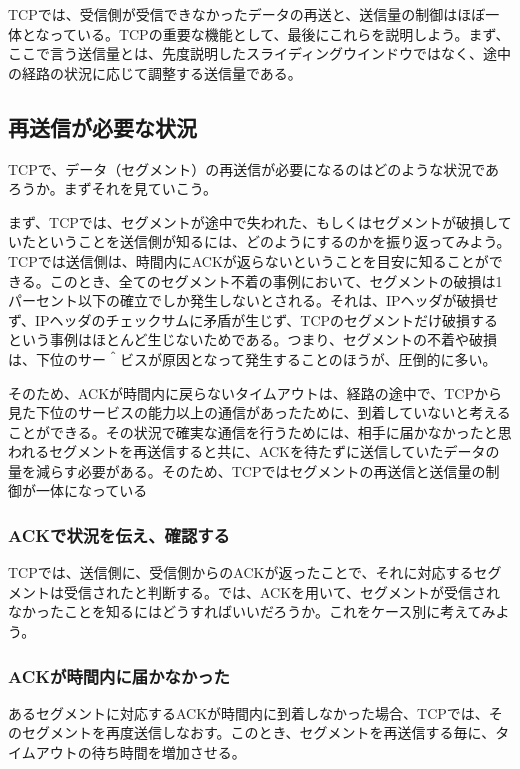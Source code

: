 TCPでは、受信側が受信できなかったデータの再送と、送信量の制御はほぼ一体となっている。TCPの重要な機能として、最後にこれらを説明しよう。まず、ここで言う送信量とは、先度説明したスライディングウインドウではなく、途中の経路の状況に応じて調整する送信量である。

\subsection{再送信が必要な状況}

TCPで、データ（セグメント）の再送信が必要になるのはどのような状況であろうか。まずそれを見ていこう。

まず、TCPでは、セグメントが途中で失われた、もしくはセグメントが破損していたということを送信側が知るには、どのようにするのかを振り返ってみよう。TCPでは送信側は、時間内にACKが返らないということを目安に知ることができる。このとき、全てのセグメント不着の事例において、セグメントの破損は1パーセント以下の確立でしか発生しないとされる。それは、IPヘッダが破損せず、IPヘッダのチェックサムに矛盾が生じず、TCPのセグメントだけ破損するという事例はほとんど生じないためである。つまり、セグメントの不着や破損は、下位のサー＾ビスが原因となって発生することのほうが、圧倒的に多い。

そのため、ACKが時間内に戻らないタイムアウトは、経路の途中で、TCPから見た下位のサービスの能力以上の通信があったために、到着していないと考えることができる。その状況で確実な通信を行うためには、相手に届かなかったと思われるセグメントを再送信すると共に、ACKを待たずに送信していたデータの量を減らす必要がある。そのため、TCPではセグメントの再送信と送信量の制御が一体になっている

\subsubsection{ACKで状況を伝え、確認する}

TCPでは、送信側に、受信側からのACKが返ったことで、それに対応するセグメントは受信されたと判断する。では、ACKを用いて、セグメントが受信されなかったことを知るにはどうすればいいだろうか。これをケース別に考えてみよう。

\subsubsection{ACKが時間内に届かなかった}

あるセグメントに対応するACKが時間内に到着しなかった場合、TCPでは、そのセグメントを再度送信しなおす。このとき、セグメントを再送信する毎に、タイムアウトの待ち時間を増加させる。

